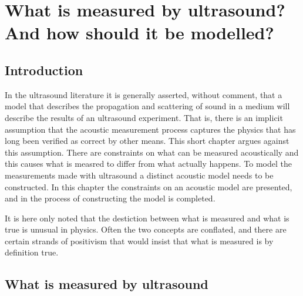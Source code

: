 

\chapter{What is measured by ultrasound?\\And how should it be modelled?}\label{ch:observables}



\section{Introduction}
In the ultrasound literature it is generally asserted, without comment,
that a model that describes the propagation and scattering of sound in a medium will describe the results of an ultrasound experiment.
That is, there is an implicit assumption that the acoustic measurement process captures the physics
that has long been verified as correct by other means. %
This short chapter argues against this assumption.
There are constraints on what can be measured acoustically
and this causes what is measred to differ from what actually happens.
To model the measurements made with ultrasound a distinct acoustic model needs to be constructed.
In this chapter the constraints on an acoustic model are presented,
and in  the process of constructing the model is completed.

It is here only noted that the destiction between what is measured and what is true is unusual in physics.
Often the two concepts are conflated,
and there are certain strands of positivism that would insist that what is measured is by definition true.


\section{What is measured by ultrasound}\label{sec:measurement}


